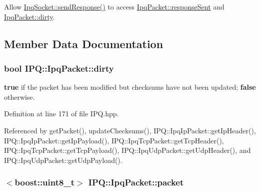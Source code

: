\-Allow \hyperlink{classIPQ_1_1IpqSocket_a53e0f4e45363cbcd919a2d96ee7cf0a8}{\-Ipq\-Socket\-::send\-Response()} to access \hyperlink{classIPQ_1_1IpqPacket_aa1a2044e8f04423ccc68a4c0a2142c6b}{\-Ipq\-Packet\-::response\-Sent} and \hyperlink{classIPQ_1_1IpqPacket_a00acebf51531043a8536f20bb9412d61}{\-Ipq\-Packet\-::dirty}. 



\subsection{\-Member \-Data \-Documentation}
\hypertarget{classIPQ_1_1IpqPacket_a00acebf51531043a8536f20bb9412d61}{
\subsubsection[{dirty}]{\setlength{\rightskip}{0pt plus 5cm}bool {\bf \-I\-P\-Q\-::\-Ipq\-Packet\-::dirty}}}
\label{classIPQ_1_1IpqPacket_a00acebf51531043a8536f20bb9412d61}


{\bfseries true} if the packet has been modified but checksums have not been updated; {\bfseries false} otherwise. 



\-Definition at line 171 of file \-I\-P\-Q.\-hpp.



\-Referenced by get\-Packet(), update\-Checksums(), \-I\-P\-Q\-::\-Ipq\-Ip\-Packet\-::get\-Ip\-Header(), \-I\-P\-Q\-::\-Ipq\-Ip\-Packet\-::get\-Ip\-Payload(), \-I\-P\-Q\-::\-Ipq\-Tcp\-Packet\-::get\-Tcp\-Header(), \-I\-P\-Q\-::\-Ipq\-Tcp\-Packet\-::get\-Tcp\-Payload(), \-I\-P\-Q\-::\-Ipq\-Udp\-Packet\-::get\-Udp\-Header(), and \-I\-P\-Q\-::\-Ipq\-Udp\-Packet\-::get\-Udp\-Payload().

\hypertarget{classIPQ_1_1IpqPacket_a2bdf247f13a3e9f86e9e3846e6a9cb45}{
\subsubsection[{packet}]{$<$boost\-::uint8\-\_\-t$>$ {\bf \-I\-P\-Q\-::\-Ipq\-Packet\-::packet}}}
\label{classIPQ_1_1IpqPacket_a2bdf247f13a3e9f86e9e3846e6a9cb45}


